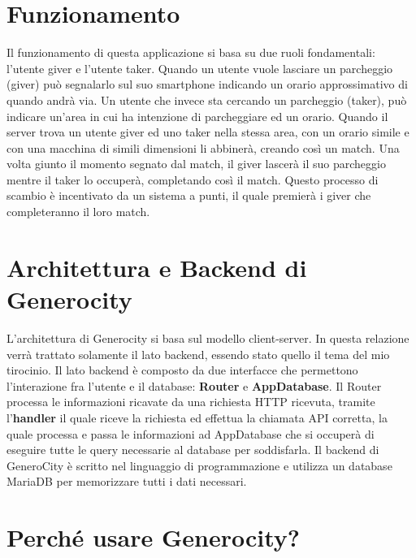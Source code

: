 \documentclass[main.tex]{subfiles}
\begin{document}
\section{Funzionamento}\label{Funzionamento}

Il funzionamento di questa applicazione si basa su due ruoli fondamentali: l'utente giver e l'utente taker.
Quando un utente vuole lasciare un parcheggio (giver) può segnalarlo sul suo smartphone indicando un orario approssimativo di quando andrà via. Un utente che invece sta cercando un parcheggio (taker), può indicare un'area in cui ha intenzione di parcheggiare ed un orario. \newline
Quando il server trova un utente giver ed uno taker nella stessa area, con un orario simile e con una macchina di simili dimensioni li abbinerà, creando così un match.
Una volta giunto il momento segnato dal match, il giver lascerà il suo parcheggio mentre il taker lo occuperà, completando così il match. \newline
Questo processo di scambio è incentivato da un sistema a punti, il quale premierà i giver che completeranno il loro match.


\section{Architettura e Backend di Generocity}

L’architettura di Generocity si basa sul modello client-server. In questa relazione verrà trattato solamente il lato backend, essendo stato quello il tema del mio tirocinio. \newline
Il lato backend è composto da due interfacce che permettono l’interazione fra l’utente e il database: \textbf{Router} e \textbf{AppDatabase}.\newline
Il Router processa le informazioni ricavate da una richiesta HTTP ricevuta, tramite l'\textbf{handler} il quale riceve la richiesta ed effettua la chiamata API corretta, la quale processa e passa le informazioni ad AppDatabase che si occuperà di eseguire tutte le query necessarie al database per soddisfarla. \newline
Il backend di GeneroCity è scritto nel linguaggio di programmazione  \cite{Go} e utilizza un database MariaDB per memorizzare tutti i dati necessari.

\section{Perché usare Generocity?}
\end{document}
